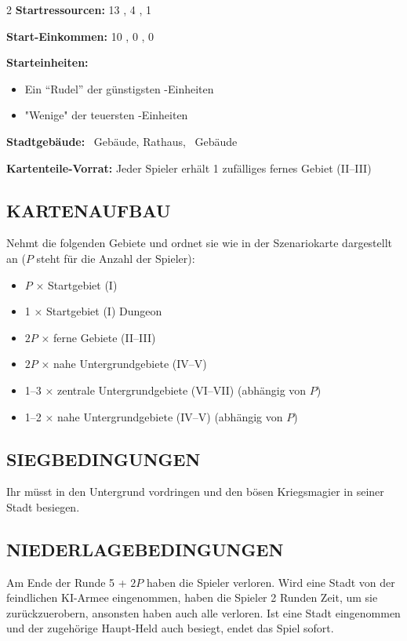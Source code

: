 \begin{multicols*}{2}
\textbf{Startressourcen:} 13 , 4 , 1  

\textbf{Start-Einkommen:} 10 , 0 , 0  

\textbf{Starteinheiten:} 
\begin{itemize} 
\item Ein ``Rudel'' der günstigsten -Einheiten 
\item "Wenige" der teuersten -Einheiten 
\end{itemize} 

\textbf{Stadtgebäude:} ~Gebäude, Rathaus, ~Gebäude 

\textbf{Kartenteile-Vorrat:} Jeder Spieler erhält 1 zufälliges fernes Gebiet (II--III) 

\subsection*{\MakeUppercase{Kartenaufbau}} Nehmt die folgenden Gebiete und ordnet sie wie in der Szenariokarte dargestellt an ($P$ steht für die Anzahl der Spieler): 

\begin{itemize} 
\item $P$ × Startgebiet (I) 
\item 1 × Startgebiet (I) Dungeon 
\item $2P$ × ferne Gebiete (II--III) 
\item $2P$ × nahe Untergrundgebiete (IV--V) 
\item 1--3 × zentrale Untergrundgebiete (VI--VII) (abhängig von $P$) 
\item 1--2 × nahe Untergrundgebiete (IV--V) (abhängig von $P$) 
\end{itemize} 

\subsection*{\MakeUppercase{Siegbedingungen}} Ihr müsst in den Untergrund vordringen und den bösen Kriegsmagier in seiner Stadt besiegen. \subsection*{\MakeUppercase{Niederlagebedingungen}} Am Ende der Runde 5 + $2P$ haben die Spieler verloren. Wird eine Stadt von der feindlichen KI-Armee eingenommen, haben die Spieler 2 Runden Zeit, um sie zurückzuerobern, ansonsten haben auch alle verloren. Ist eine Stadt eingenommen und der zugehörige Haupt-Held auch besiegt, endet das Spiel sofort.

\end{multicols*}
